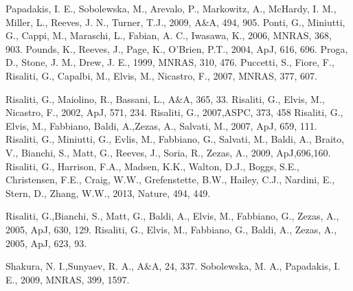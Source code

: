 \documentclass[useAMS,usenatbib]{sam}
\begin{document}
\begin{thebibliography}{99}
     Papadakis, I. E., Sobolewska,  M., Arevalo,  P., Markowitz, A., McHardy, I. M., Miller,  L.,
Reeves, J. N., 
Turner, T.J., 2009, A\&A, 494, 905.
     Ponti, G., Miniutti, G., Cappi, M., Maraschi, L., Fabian, A. C., Iwasawa, K., 2006, MNRAS, 368, 903.
     Pounds, K., Reeves, J., Page, K., O'Brien, P.T., 2004, ApJ, 616, 696.
     Proga, D., Stone, J. M., Drew, J. E., 1999, MNRAS, 310, 476.
     Puccetti, S., Fiore, F., Risaliti, G., Capalbi, M., Elvis, M., Nicastro, F., 2007, MNRAS, 377, 607.
    

     Risaliti, G., Maiolino, R., Bassani, L., A\&A, 365, 33.
     Risaliti, G., Elvis, M., Nicastro, F., 2002, ApJ, 571, 234.
     Risaliti, G., 2007,ASPC, 373, 458
     Risaliti, G., Elvis, M., Fabbiano, Baldi, A.,Zezas, A., Salvati, M., 2007, ApJ, 659, 111.
     Risaliti, G., Miniutti, G., Evlis, M., Fabbiano, G., Salvati, M., Baldi, A., Braito, V., 
									 Bianchi, S., Matt, G., Reeves, J., Soria, R., Zezas, A., 2009, ApJ,696,160.     
     Risaliti, G., Harrison, F.A., Madsen, K.K., Walton, D.J., Boggs, S.E., Christensen,  F.E., 
							Craig, W.W., Grefenstette, B.W., Hailey, C.J., Nardini, E., Stern, D., Zhang, W.W., 2013, Nature, 494, 449. 

     Risaliti, G.,Bianchi, S., Matt, G., Baldi, A., Elvis, M., Fabbiano, G., Zezas, A., 2005, ApJ,
630, 129.
     Risaliti, G., Elvis, M., Fabbiano, G., Baldi, A., Zezas, A., 2005, ApJ, 623, 93.
    
     Shakura, N. I.,Sunyaev, R. A., A\&A, 24, 337.
     Sobolewska, M. A., Papadakis, I. E., 2009, MNRAS, 399, 1597.


\end{thebibliography}
\end{document}
